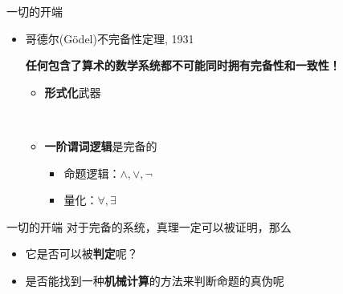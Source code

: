 \documentclass{myslide}
\begin{document}
\begin{frame}[fragile]{一切的开端}
\begin{itemize}
	\item 哥德尔(G\"odel)不完备性定理, 1931
	\begin{center}
		\textbf{任何包含了算术的数学系统都不可能同时拥有完备性和一致性！}
	\end{center}
	\pause
	\begin{itemize}
		\item \textbf{形式化}武器\\
		\pause
		\\
		\pause
		\pause
		\item \textbf{一阶谓词逻辑}是完备的
		\begin{itemize}
			\item 命题逻辑：$\land,\lor,\lnot$
			\item 量化：$\forall,\exists$
		\end{itemize}
	\end{itemize}
\end{itemize}
\end{frame}

\begin{frame}{一切的开端}
对于完备的系统，真理一定可以被证明，那么
\begin{itemize}
	\item 它是否可以被\textbf{判定}呢？
	\item 是否能找到一种\textbf{机械计算}的方法来判断命题的真伪呢
\end{itemize}
\end{frame}
\end{document}

